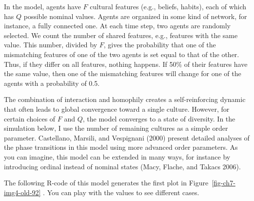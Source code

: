 \documentclass[
  a4paper,
  DIV=11,
  numbers=noendperiod,
  oneside]{scrreprt}
\begin{document}
In the model, agents have \(F\) cultural features (e.g., beliefs,
habits), each of which has \(Q\) possible nominal values. Agents are
organized in some kind of network, for instance, a fully connected one.
At each time step, two agents are randomly selected. We count the number
of shared features, e.g., features with the same value. This number,
divided by \(F\), gives the probability that one of the mismatching
features of one of the two agents is set equal to that of the other.
Thus, if they differ on all features, nothing happens. If 50\% of their
features have the same value, then one of the mismatching features will
change for one of the agents with a probability of 0.5.

The combination of interaction and homophily creates a self-reinforcing
dynamic that often leads to global convergence toward a single culture.
However, for certain choices of \(F\) and \(Q\), the model converges to
a state of diversity. In the simulation below, I use the number of
remaining cultures as a simple order parameter. Castellano, Marsili, and
Vespignani (2000) present detailed analyses of the phase transitions in
this model using more advanced order parameters. As you can imagine,
this model can be extended in many ways, for instance by introducing
ordinal instead of nominal states (Macy, Flache, and Takacs 2006).

The following R-code of this model generates the first plot in
Figure~\ref{fig-ch7-img4-old-92} . You can play with the values to see
different cases.
\end{document}
